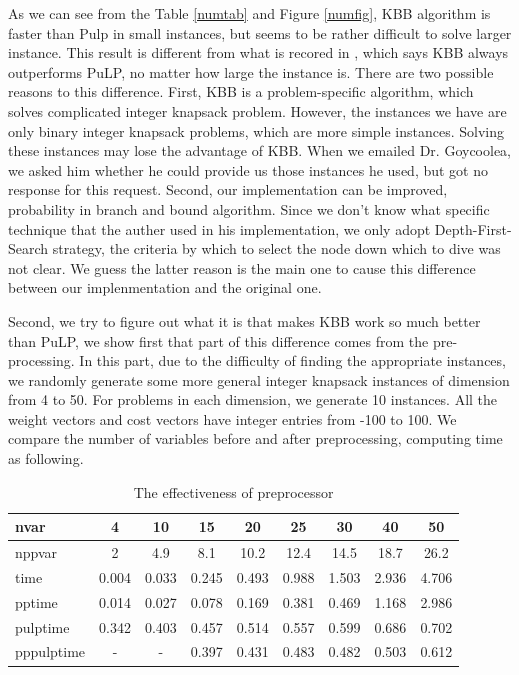 \documentclass[a4paper,11pt]{article}
\begin{document}
As we can see from the Table \ref{numtab} and Figure \ref{numfig}, KBB algorithm is faster than Pulp in small instances, but seems to be rather difficult to solve larger instance. This result is different from what is recored in \cite{fukasawa2011exact}, which says KBB always outperforms PuLP, no matter how large the instance is. There are two possible reasons to this difference. First, KBB is a problem-specific algorithm, which solves complicated integer knapsack problem. However, the instances we have are only binary integer knapsack problems, which are more simple instances. Solving these instances may lose the advantage of KBB. When we emailed Dr. Goycoolea, we asked him whether he could provide us those instances he used, but got no response for this request. Second, our implementation can be improved, probability in branch and bound algorithm. Since we don't know what specific technique that the auther used in his implementation, we only adopt Depth-First-Search strategy, the criteria by which to select the node down which to dive was not clear. We guess the latter reason is the main one to cause this difference between our implenmentation and the original one.

Second, we try to figure out what it is that makes KBB work so much better than PuLP,  we show first that part of this difference comes from the pre-processing. In this part, due to the difficulty of finding the appropriate instances, we randomly generate some more general integer knapsack instances of dimension from 4 to 50. For problems in each dimension, we generate 10 instances.  All the weight vectors and cost vectors have integer entries from -100 to 100. We compare the number of variables before and after preprocessing, computing time as following.

\begin{table}[H]
\begin{center}
\begin{tabular}{l c c c c c c c c}
\hline
nvar&4&10&15&20&25&30&40&50\\
\hline
nppvar &2&4.9 &8.1 &10.2 &12.4 &14.5 &18.7 &26.2\\
time&0.004&0.033&0.245&0.493&0.988&1.503&2.936&4.706\\
pptime&0.014&0.027&0.078&0.169&0.381&0.469&1.168&2.986\\
pulptime&0.342&0.403&0.457&0.514&0.557&0.599&0.686&0.702\\
pppulptime&-&-&0.397&0.431&0.483&0.482&0.503&0.612\\
\hline
\end{tabular}
\end{center}
\caption{The effectiveness of preprocessor \label{t3}}
\end{table}
\end{document}
